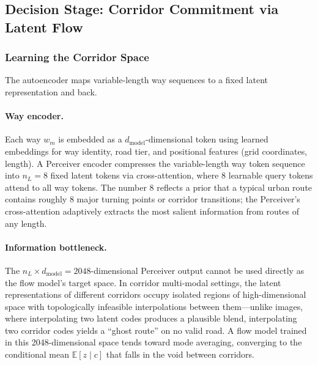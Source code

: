 \subsection{Decision Stage: Corridor Commitment via Latent Flow}

\subsubsection{Learning the Corridor Space}

The autoencoder maps variable-length way sequences to a fixed latent representation and back.

\paragraph{Way encoder.}
Each way $w_m$ is embedded as a $d_{\mathrm{model}}$-dimensional token using learned embeddings for way identity, road tier, and positional features (grid coordinates, length).
A Perceiver encoder \citep{jaegle2021perceiver} compresses the variable-length way token sequence into $n_L = 8$ fixed latent tokens via cross-attention, where 8 learnable query tokens attend to all way tokens.
The number 8 reflects a prior that a typical urban route contains roughly 8 major turning points or corridor transitions; the Perceiver's cross-attention adaptively extracts the most salient information from routes of any length.

\paragraph{Information bottleneck.}
The $n_L \times d_{\mathrm{model}} = 2048$-dimensional Perceiver output cannot be used directly as the flow model's target space.
In corridor multi-modal settings, the latent representations of different corridors occupy isolated regions of high-dimensional space with topologically infeasible interpolations between them---unlike images, where interpolating two latent codes produces a plausible blend, interpolating two corridor codes yields a ``ghost route'' on no valid road.
A flow model trained in this 2048-dimensional space tends toward mode averaging, converging to the conditional mean $\mathbb{E}[z \mid c]$ that falls in the void between corridors.

